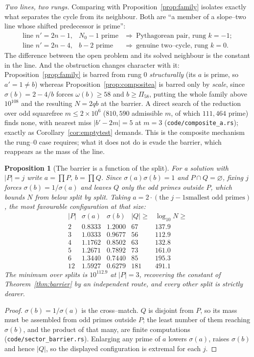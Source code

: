 \documentclass[11pt]{article}
\newtheorem{proposition}[theorem]{Proposition}
\theoremstyle{definition}
\begin{document}
\emph{Two lines, two rungs.} Comparing with Proposition~\ref{prop:family} isolates exactly what separates the cycle from its
neighbour. Both are ``a member of a slope--two line whose shifted predecessor is prime'':
\[
\begin{array}{lll}
\text{line } n'=2n-1, & N_0-1 \text{ prime} & \Longrightarrow\ \text{Pythagorean pair, rung } k=-1;\\
\text{line } n'=2n-4, & b-2 \text{ prime}   & \Longrightarrow\ \text{genuine two--cycle, rung } k=0.
\end{array}
\]
The difference between the open problem and its solved neighbour is the constant in the line. And the
obstruction changes character with it: Proposition~\ref{prop:family} is barred from rung $0$
\emph{structurally} (its $a$ is prime, so $a'=1\ne b$) whereas Proposition~\ref{prop:compositea}
is barred only by \emph{scale}, since $\sigma(b)=2-4/b$ forces $\omega(b)\ge58$ and $b\ge\Pi_{58}$,
putting the whole family above $10^{108}$ and the resulting $N=2qb$ at the barrier. A direct search of
the reduction over odd squarefree $m\le2\times10^6$ ($810{,}590$ admissible $m$, of which $111{,}464$
prime) finds none, with nearest miss $|b'-2m|=5$ at $m=3$ (\texttt{code/composite\_a.rs}); exactly
as Corollary~\ref{cor:emptytest} demands. This is the composite mechanism the rung--$0$ case requires;
what it does not do is evade the barrier, which reappears as the mass of the line.


\begin{proposition}[The barrier is a function of the split]\label{prop:sectorbarrier}
For a solution with $|P|=j$ write $a=\prod P$, $b=\prod Q$. Since $\sigma(a)\sigma(b)=1$ and
$P\cap Q=\varnothing$, fixing $j$ forces $\sigma(b)=1/\sigma(a)$ and leaves $Q$ only the odd primes
outside $P$, which bounds $N$ from below split by split. Taking $a=2\cdot(\text{the }j-1\text{
smallest odd primes})$, the most favourable configuration at that size:
\[
\begin{array}{r|cccc}
|P| & \sigma(a) & \sigma(b) & |Q|\ge & \log_{10}N\ge\\\hline
2 & 0.8333 & 1.2000 & 67 & 137.9\\
3 & 1.0333 & 0.9677 & 56 & 112.9\\
4 & 1.1762 & 0.8502 & 63 & 132.8\\
5 & 1.2671 & 0.7892 & 73 & 161.0\\
6 & 1.3440 & 0.7440 & 85 & 195.3\\
12 & 1.5927 & 0.6279 & 181 & 491.1
\end{array}
\]
The minimum over splits is $10^{112.9}$ at $|P|=3$, recovering the constant of
Theorem~\ref{thm:barrier} by an independent route, and every other split is strictly dearer.
\end{proposition}
\begin{proof}
$\sigma(b)=1/\sigma(a)$ is the cross--match. $Q$ is disjoint from $P$, so its mass must be assembled
from odd primes outside $P$; the least number of them reaching $\sigma(b)$, and the product of that
many, are finite computations (\texttt{code/sector\_barrier.rs}). Enlarging any prime of $a$ lowers
$\sigma(a)$, raises $\sigma(b)$ and hence $|Q|$, so the displayed configuration is extremal for each
$j$.
\end{proof}
\end{document}
